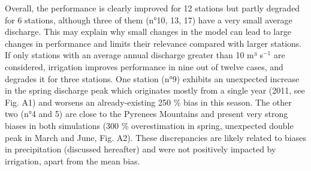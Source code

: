 Overall, the performance is clearly improved for 12 stations but partly degraded for 6 stations, although three of them (n°10, 13, 17) have a very small average discharge. This may explain why small changes in the model can lead to large changes in performance and limits their relevance compared with larger stations. If only stations with an average annual discharge greater than 10 m³ s$^{-1}$ are considered, irrigation improves performance in nine out of twelve cases, and degrades it for three stations. One station (n°9) exhibits an unexpected increase in the spring discharge peak which originates mostly from a single year (2011, see Fig. A1) and worsens an already-existing 250 \% bias in this season. The other two (n°4 and 5) are close to the Pyrenees Mountains and present very strong biases in both simulations (300 \% overestimation in spring, unexpected double peak in March and June, Fig. A2). These discrepancies are likely related to biases in precipitation (discussed hereafter) and were not positively impacted by irrigation, apart from the mean bias.

